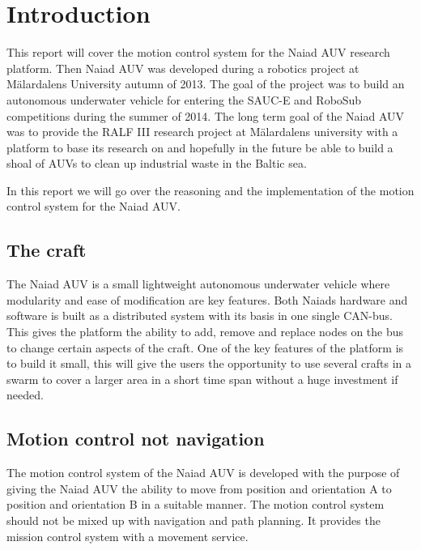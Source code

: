 \section{Introduction}\label{sec:introduction}

This report will cover the motion control system for the Naiad AUV research platform. Then Naiad AUV was developed during a robotics project at M\"alardalens University autumn of 2013. The goal of the project was to build an autonomous underwater vehicle for entering the SAUC-E and RoboSub competitions during the summer of 2014. The long term goal of the Naiad AUV was to provide the RALF III research project at M\"alardalens university with a platform to base its research on and hopefully in the future be able to build a shoal of AUVs to clean up industrial waste in the Baltic sea.

In this report we will go over the reasoning and the implementation of the motion control system for the Naiad AUV. 

\pagebreak

\subsection{The craft}

The Naiad AUV is a small lightweight autonomous underwater vehicle where modularity and ease of modification are key features. Both Naiads hardware and software is built as a distributed system with its basis in one single CAN-bus. This gives the platform the ability to add, remove and replace nodes on the bus to change certain aspects of the craft. One of the key features of the platform is to build it small, this will give the users the opportunity to use several crafts in a swarm to cover a larger area in a short time span without a huge investment if needed.

\subsection{Motion control not navigation}

The motion control system of the Naiad AUV is developed with the purpose of giving the Naiad AUV the ability to move from position and orientation A to position and orientation B in a suitable manner. The motion control system should not be mixed up with navigation and path planning. It provides the mission control system with a movement service.

